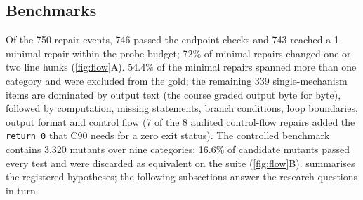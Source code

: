 \documentclass[a4paper,preprint,12pt,authoryear]{elsarticle}
\begin{document}
\subsection{Benchmarks}
Of the 750 repair events, 746 passed the endpoint checks and 743 reached a 1-minimal repair within the probe budget; 72\% of minimal repairs changed one or two line hunks (\cref{fig:flow}A). 54.4\% of the minimal repairs spanned more than one category and were excluded from the gold; the remaining 339 single-mechanism items are dominated by output text (the course graded output byte for byte), followed by computation, missing statements, branch conditions, loop boundaries, output format and control flow (7 of the 8 audited control-flow repairs added the \texttt{return 0} that C90 needs for a zero exit status). The controlled benchmark contains 3,320 mutants over nine categories; 16.6\% of candidate mutants passed every test and were discarded as equivalent on the suite (\cref{fig:flow}B).  summarises the registered hypotheses; the following subsections answer the research questions in turn.

\begin{table}[t]
\centering
\caption{Registered hypotheses: mean difference over cohorts, 95\% bootstrap interval and verdict (H1a reports the mean outcome ceiling itself). H2 and H3 are reported for K-means and HAC.}\label{tab:hyp}
\small
{}
\end{table}
\end{document}
